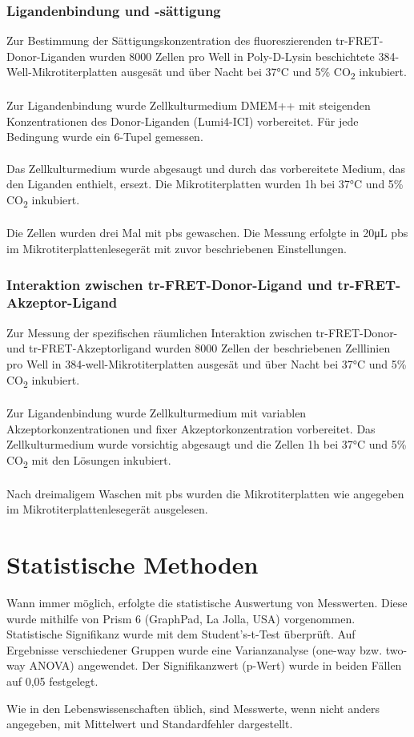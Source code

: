\subsubsection{Ligandenbindung und -sättigung}
Zur Bestimmung der Sättigungskonzentration des fluoreszierenden tr-FRET-Donor-Liganden wurden 8000 Zellen pro Well in Poly-D-Lysin beschichtete 384-Well-Mikrotiterplatten ausgesät und über Nacht bei 37\si{\celsius} und 5\% CO\textsubscript{2} inkubiert. 
\\ \\
Zur Ligandenbindung wurde Zellkulturmedium DMEM++ mit steigenden Konzentrationen des Donor-Liganden (Lumi4-ICI) vorbereitet. Für jede Bedingung wurde ein 6-Tupel gemessen.
\\ \\
Das Zellkulturmedium wurde abgesaugt und durch das vorbereitete Medium, das den Liganden enthielt, ersezt. Die Mikrotiterplatten wurden 1\si{\hour} bei 37\si{\celsius} und 5\% CO\textsubscript{2} inkubiert.
\\ \\
Die Zellen wurden drei Mal mit \gls{pbs} gewaschen. Die Messung erfolgte in 20\si{\micro\liter} \gls{pbs} im Mikrotiterplattenlesegerät mit zuvor beschriebenen Einstellungen.

\subsubsection{Interaktion zwischen tr-FRET-Donor-Ligand und tr-FRET-Akzeptor-Ligand}
Zur Messung der spezifischen räumlichen Interaktion zwischen tr-FRET-Donor- und tr-FRET-Akzeptorligand wurden 8000 Zellen der beschriebenen Zelllinien pro Well in 384-well-Mikrotiterplatten ausgesät und über Nacht bei 37\si{\celsius} und 5\% CO\textsubscript{2} inkubiert.
\\ \\
Zur Ligandenbindung wurde Zellkulturmedium mit variablen Akzeptorkonzentrationen und fixer Akzeptorkonzentration vorbereitet. Das Zellkulturmedium wurde vorsichtig abgesaugt und die Zellen 1\si{\hour} bei 37\si{\celsius} und 5\% CO\textsubscript{2} mit den Lösungen inkubiert.
\\ \\  
Nach dreimaligem Waschen mit \gls{pbs} wurden die Mikrotiterplatten wie angegeben im Mikrotiterplattenlesegerät ausgelesen.

\section{Statistische Methoden}
Wann immer möglich, erfolgte die statistische Auswertung von Messwerten. Diese wurde mithilfe von Prism 6 (GraphPad, La Jolla, USA) vorgenommen. Statistische Signifikanz wurde mit dem Student's-t-Test überprüft. Auf Ergebnisse verschiedener Gruppen wurde eine Varianzanalyse (one-way bzw. two-way ANOVA) angewendet. Der Signifikanzwert (p-Wert) wurde in beiden Fällen auf 0,05 festgelegt. 

Wie in den Lebenswissenschaften üblich, sind Messwerte, wenn nicht anders angegeben, mit Mittelwert und Standardfehler dargestellt. 

